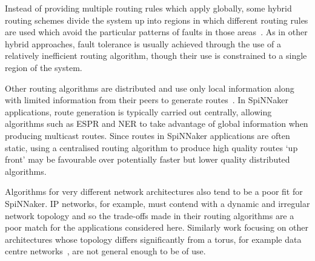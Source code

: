 			Instead of providing multiple routing rules which apply globally, some
			hybrid routing schemes divide the system up into regions in which
			different routing rules are used which avoid the particular patterns of
			faults in those areas~\cite{mejia06,boppana95}. As in other hybrid
			approaches, fault tolerance is usually achieved through the use of a
			relatively inefficient routing algorithm, though their use is constrained
			to a single region of the system.
			
			Other routing algorithms are distributed and use only local information
			along with limited information from their peers to generate
			routes~\cite{fick09b}. In SpiNNaker applications, route generation is
			typically carried out centrally, allowing algorithms such as ESPR and NER
			to take advantage of global information when producing multicast routes.
			Since routes in SpiNNaker applications are often static, using a
			centralised routing algorithm to produce high quality routes `up front'
			may be favourable over potentially faster but lower quality distributed
			algorithms.
			
			Algorithms for very different network architectures also tend to be a
			poor fit for SpiNNaker. IP networks, for example, must contend with a
			dynamic and irregular network topology and so the trade-offs made in
			their routing algorithms are a poor match for the applications considered
			here.  Similarly work focusing on other architectures whose topology
			differs significantly from a torus, for example data centre
			networks~\cite{guo08,liao12}, are not general enough to be of use.
			
	
